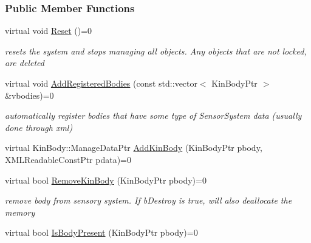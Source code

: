 \subsubsection*{Public Member Functions}
\begin{DoxyCompactItemize}
\item 
\hypertarget{classOpenRAVE_1_1SensorSystemBase_a43a787400d2a563b9eee1a149225c18a}{
virtual void \hyperlink{classOpenRAVE_1_1SensorSystemBase_a43a787400d2a563b9eee1a149225c18a}{Reset} ()=0}
\label{classOpenRAVE_1_1SensorSystemBase_a43a787400d2a563b9eee1a149225c18a}

\begin{DoxyCompactList}\small\item\em resets the system and stops managing all objects. Any objects that are not locked, are deleted \item\end{DoxyCompactList}\item 
\hypertarget{classOpenRAVE_1_1SensorSystemBase_ae1bb21dc8031749ad2dd549b7c9d6cc6}{
virtual void \hyperlink{classOpenRAVE_1_1SensorSystemBase_ae1bb21dc8031749ad2dd549b7c9d6cc6}{AddRegisteredBodies} (const std::vector$<$ KinBodyPtr $>$ \&vbodies)=0}
\label{classOpenRAVE_1_1SensorSystemBase_ae1bb21dc8031749ad2dd549b7c9d6cc6}

\begin{DoxyCompactList}\small\item\em automatically register bodies that have some type of SensorSystem data (usually done through xml) \item\end{DoxyCompactList}\item 
virtual KinBody::ManageDataPtr \hyperlink{classOpenRAVE_1_1SensorSystemBase_a97c5f9efa14de77c511e1c83048ada63}{AddKinBody} (KinBodyPtr pbody, XMLReadableConstPtr pdata)=0
\item 
\hypertarget{classOpenRAVE_1_1SensorSystemBase_a4363ba6a1a7e1599c6987bf3a185660b}{
virtual bool \hyperlink{classOpenRAVE_1_1SensorSystemBase_a4363ba6a1a7e1599c6987bf3a185660b}{RemoveKinBody} (KinBodyPtr pbody)=0}
\label{classOpenRAVE_1_1SensorSystemBase_a4363ba6a1a7e1599c6987bf3a185660b}

\begin{DoxyCompactList}\small\item\em remove body from sensory system. If bDestroy is true, will also deallocate the memory \item\end{DoxyCompactList}\item 
\hypertarget{classOpenRAVE_1_1SensorSystemBase_affd950fc48ad8eb437bf8a19e8d10b5c}{
virtual bool \hyperlink{classOpenRAVE_1_1SensorSystemBase_affd950fc48ad8eb437bf8a19e8d10b5c}{IsBodyPresent} (KinBodyPtr pbody)=0}
\label{classOpenRAVE_1_1SensorSystemBase_affd950fc48ad8eb437bf8a19e8d10b5c}


\end{DoxyCompactItemize}
